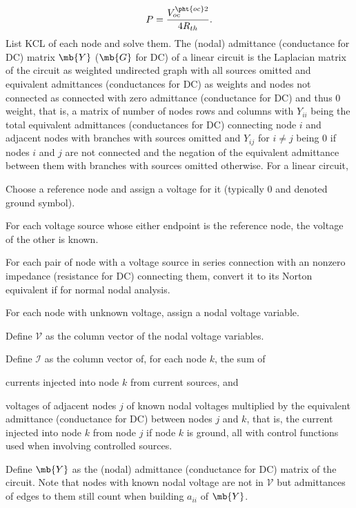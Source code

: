\documentclass[a4paper,12pt]{article}
\begin{document}
\[P=\frac{V_{oc}^{\pht{oc}2}}{4R_{th}}.\]
List KCL of each node and solve them.
The (nodal) admittance (conductance for DC) matrix $\mb{Y}$ ($\mb{G}$ for DC) of a linear circuit is the Laplacian matrix of the circuit as weighted undirected graph with all sources omitted and equivalent admittances (conductances for DC) as weights and nodes not connected as connected with zero admittance (conductance for DC) and thus 0 weight, that is, a matrix of number of nodes rows and columns with $Y_{ii}$ being the total equivalent admittances (conductances for DC) connecting node $i$ and adjacent nodes with branches with sources omitted and $Y_{ij}$ for $i\ne j$ being $0$ if nodes $i$ and $j$ are not connected and the negation of the equivalent admittance between them with branches with sources omitted otherwise.
For a linear circuit,
\ben
\item Choose a reference node and assign a voltage for it (typically 0 and denoted ground symbol).
\item For each voltage source whose either endpoint is the reference node, the voltage of the other is known.
\item For each pair of node with a voltage source in series connection with an nonzero impedance (resistance for DC) connecting them, convert it to its Norton equivalent if for normal nodal analysis.
\item For each node with unknown voltage, assign a nodal voltage variable.
\item Define $\mathcal{V}$ as the column vector of the nodal voltage variables.
\item Define $\mathcal{I}$ as the column vector of, for each node $k$, the sum of
\bit
\item currents injected into node $k$ from current sources, and
\item voltages of adjacent nodes $j$ of known nodal voltages multiplied by the equivalent admittance (conductance for DC) between nodes $j$ and $k$, that is, the current injected into node $k$ from node $j$ if node $k$ is ground,
\eit
all with control functions used when involving controlled sources.
\item Define $\mb{Y}$ as the (nodal) admittance (conductance for DC) matrix of the circuit. Note that nodes with known nodal voltage are not in $\mathcal{V}$ but admittances of edges to them still count when building $a_{ii}$ of $\mb{Y}$.
\end{document}
